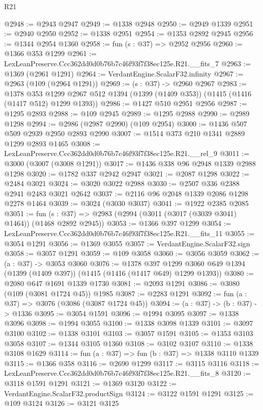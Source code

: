 \begin{lexlean}{R21}
\begin{coremodule}
@2948 := @2943 @2947
@2949 := @1338 @2948
@2950 := @2949 @1339
@2951 := @2940 @2950
@2952 := @1338 @2951
@2954 := @1353 @2892 @2945
@2956 := @1344 @2954 @1360
@2958 := fun (s : @37) => @2952 @2956
@2960 := @1366 @353 @1299
@2961 := LexLeanPreserve.Ccc362dd0d0b76b7c46f93f7f38ec125e.R21.__fits_7
@2963 := @1369 (@2961 @1291)
@2964 := VerdantEngine.ScalarF32.infinity
@2967 := @2963 (@109 (@2964 @1291))
@2969 := (s : @37) -> @2960 @2967
@2983 := @1378
    @353
    @1299
    @2967
    @512
    @1394
    (@1399 (@1409 @353))
    (@1415 (@1416 (@1417 @512) @1299 @1393))
@2986 := @1427 @510 @2951 @2956
@2987 := @1295 @2893
@2988 := @109 @2945
@2989 := @1295 @2988
@2990 := @2989 @1298
@2994 := @2986 (@2987 @2990) (@109 @2954)
@3000 := @1436 @507 @509 @2939 @2950 @2893 @2990
@3007 := @1514 @373 @210 @1341 @2889 @1299 @2893 @1465
@3008 := LexLeanPreserve.Ccc362dd0d0b76b7c46f93f7f38ec125e.R21.__rel_9
@3011 := @3000 (@3007 (@3008 @1291))
@3017 := @1436 @338 @96 @2948 @1339 @2988 @1298
@3020 := @1782 @337 @2942 @2947
@3021 := @2087 @1298
@3022 := @2484 @3021
@3024 := @3020 @3022 @2988
@3030 := @2507 @336 @2388 @2941 @2483 @3021 @2642
@3037 := @2116 @96 @2048 @1339 @2086 @1298 @2278 @1464
@3039 := @3024 (@3030 @3037)
@3041 := @1922 @2385 @2085
@3051 := fun (s : @37) => @2983 (@2994 (@3011 (@3017 (@3039 @3041) @1464)) (@1468 @2892 @2945))
@3053 := @1366 @397 @1299
@3054 := LexLeanPreserve.Ccc362dd0d0b76b7c46f93f7f38ec125e.R21.__fits_11
@3055 := @3054 @1291
@3056 := @1369 @3055
@3057 := VerdantEngine.ScalarF32.sign
@3058 := @3057 @1291
@3059 := @109 @3058
@3060 := @3056 @3059
@3062 := (a : @37) -> @3053 @3060
@3076 := @1378
    @397
    @1299
    @3060
    @649
    @1394
    (@1399 (@1409 @397))
    (@1415 (@1416 (@1417 @649) @1299 @1393))
@3080 := @2080 @647 @1691 @1339 @1730
@3081 := @2093 @1291
@3086 := @3080 (@109 (@3081 @1724 @45)) @1985
@3087 := @2283 @1291
@3092 := fun (a : @37) => @3076 (@3086 (@3087 @1724 @45))
@3094 := (a : @37) -> (b : @37) -> @1336
@3095 := @3054 @1591
@3096 := @1994 @3095
@3097 := @1338 @3096
@3098 := @1994 @3055
@3100 := @1338 @3098 @1339
@3101 := @3097 @3100
@3102 := @1338 @3101
@3103 := @3057 @1591
@3105 := @1353 @3103 @3058
@3107 := @1344 @3105 @1360
@3108 := @3102 @3107
@3110 := @1338 @3108 @1629
@3114 := fun (a : @37) => fun (b : @37) => @1338 @3110 @1339
@3115 := @1366 @358
@3116 := @2690 @1299
@3117 := @3115 @3116
@3118 := LexLeanPreserve.Ccc362dd0d0b76b7c46f93f7f38ec125e.R21.__fits_8
@3120 := @3118 @1591 @1291
@3121 := @1369 @3120
@3122 := VerdantEngine.ScalarF32.productSign
@3124 := @3122 @1591 @1291
@3125 := @109 @3124
@3126 := @3121 @3125

\end{coremodule}
\end{lexlean}
